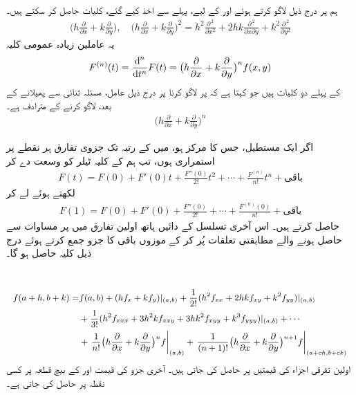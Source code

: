 ہم  پر  درج ذیل   لاگو کرتے ہوئے  اور  کے لیے،   پہلے سے   اخذ  کیے گئے،  کلیات  حاصل کر سکتے ہیں۔
\begin{align*}
\big(h\frac{\partial}{\partial x}+k\frac{\partial}{\partial y}\big),\quad \big(h\frac{\partial}{\partial x}+k\frac{\partial}{\partial y}\big)^2=h^2\frac{\partial^{\,2}}{\partial x^2}+2hk\frac{\partial^{\,2}}{\partial x\partial y}+k^2\frac{\partial^{\,2}}{\partial y^2}
\end{align*}
یہ عاملین زیادہ عمومی کلیہ
\begin{align}\label{مساوات_کثیرالمتغیر_عمومی_ٹیلر_عاملین}
F^{(n)}(t)=\frac{\dif^{\,n}}{\dif t^n}F(t)=\big(h\frac{\partial}{\partial x}+k\frac{\partial}{\partial y}\big)^nf(x,y)
\end{align}
کے  پہلے  دو کلیات ہیں جو کہتا ہے کہ  پر  لاگو کرنا     پر درج ذیل عامل، مسئلہ ثنائی سے پھیلانے کے بعد،   لاگو کرنے کے مترادف ہے۔
\begin{align*}
\big(h\frac{\partial}{\partial x}+k\frac{\partial}{\partial y}\big)^n
\end{align*}

اگر ایک مستطیل، جس کا مرکز  ہو، میں    کے  رتبہ تک جزوی تفارق ہر نقطے  پر  استمراری ہوں، تب ہم  کے  کلیہ ٹیلر کو وسعت  دے کر
\begin{align*}
F(t)=F(0)+F'(0)t+\frac{F''(0)}{2!}t^2+\cdots+\frac{F^{(n)}}{n!}t^n+\text{باقی}
\end{align*} 
لکھتے ہوئے   لے کر
\begin{align*}
F(1)=F(0)+F'(0)+\frac{F''(0)}{2!}+\cdots+\frac{F^{(n)}(0)}{n!}+\text{باقی}
\end{align*}
حاصل کرتے ہیں۔ اس آخری  تسلسل   کے  دائیں ہاتھ    اولین  تفارق میں    پر  مساوات  سے حاصل ہونے والے  مطابقتی  تعلقات  پُر   کر کے موزوں باقی کا  جزو جمع کرتے ہوئے درج ذیل کلیہ حاصل ہو گا۔

\\
\begin{gather}
{\small{
\begin{aligned}\label{مساوات_کثیرالمتغیر_دو_متغیری_تفاعل_ٹیلر_کلیہ_الف}
f(a+h,b+k)=&f(a,b)+(hf_x+kf_y)\vert_{(a,b)}+\frac{1}{2!}(h^2f_{xx}+2hkf_{xy}+k^2f_{yy})\vert_{(a,b)}\\
&+\frac{1}{3!}(h^2f_{xxx}+3h^2kf_{xxy}+3hk^2f_{xyy}+k^3f_{yyy})\vert_{(a,b)}+\cdots\\
&+\left.\frac{1}{n!}\big(h\frac{\partial}{\partial x}+k\frac{\partial}{\partial y}\big)^nf\right\vert_{(a,b)}+\left.\frac{1}{(n+1)!}\big(h\frac{\partial}{\partial x}+k\frac{\partial}{\partial y}\big)^{n+1}f\right\vert_{(a+ch,b+ck)}
\end{aligned}
}}
\end{gather}
اولین  تفرقی اجزاء کی قیمتیں    پر حاصل کی جاتی ہیں۔ آخری جزو  کی قیمت   اور  کے بیچ قطعہ پر کسی نقطہ   پر حاصل کی جاتی ہے۔

